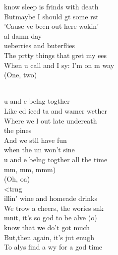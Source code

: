 \begin{cancion}%
	know sleep is frinds with death\\
	Butmaybe I should gt some rst\\
	'Cause ve been out here wokin' \\
	al damn day   \\
	ueberries and buterflies\\
	The prtty things that gret my ees\\
	When u call and I sy: I'm on m way\\
(One, two)\\\jump\\
	\begin{chorus}%
	u and e belng togther\\
	Like cd iced ta and wamer wether\\
	Where we l out late undereath \\
the pines\\
	And we stll have fun \\
	when the un won't sine\\
	u and e belng togther all the time\\
	mm, mm, mmm)\\
	(Oh, oa)\\
	<trng\\
	illin' wine and homeade drinks\\
	We trow a cheers, the wories snk\\
	mnit, it's so god to be alve (o)\\
	 know that we do't got much\\
	But,then again, it's jut enugh\\
	To alys find a wy for a god time\\\jump\\

\end{chorus}
\end{cancion}
